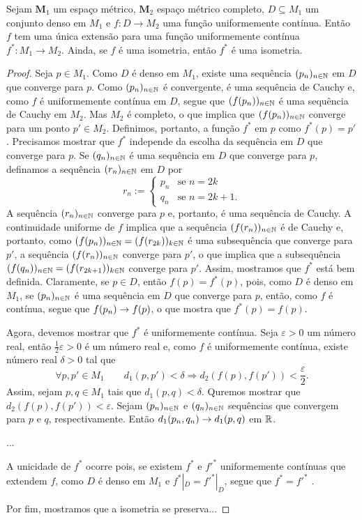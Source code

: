 \begin{teo}
Sejam $\bm M_1$  um espaço métrico, $\bm M_2$ espaço métrico completo, $D \subseteq M_1$ um conjunto denso em $M_1$ e $f: D \to M_2$ uma função uniformemente contínua. Então $f$ tem uma única extensão para uma função uniformemente contínua $f^*: M_1 \to M_2$. Ainda, se $f$ é uma isometria, então $f^*$ é uma isometria.
\end{teo}
\begin{proof}
	Seja $p \in M_1$. Como $D$ é denso em $M_1$, existe uma sequência $(p_n)_{n \in \mathbb{N}}$ em $D$ que converge para $p$. Como $(p_n)_{n \in \mathbb{N}}$ é convergente, é uma sequência de Cauchy e, como $f$ é uniformemente contínua em $D$, segue que $(f(p_n))_{n \in \mathbb{N}}$ é uma sequência de Cauchy em $M_2$. Mas $M_2$ é completo, o que implica que $(f(p_n))_{n \in \mathbb{N}}$ converge para um ponto $p' \in M_2$. Definimos, portanto, a função $f^*$ em $p$ como $f^*(p)=p'$. Precisamos mostrar que $f^*$ independe da escolha da sequência em $D$ que converge para $p$. Se $(q_n)_{n \in \mathbb{N}}$ é uma sequência em $D$ que converge para $p$, definamos a sequência $(r_n)_{n \in \mathbb{N}}$ em $D$ por
	\begin{equation*}
	r_n :=
			\begin{cases}
			p_n &\text{se $n=2k$}\\
			q_n &\text{se $n=2k+1$}.
			\end{cases}
	\end{equation*}
A sequência $(r_n)_{n \in \mathbb{N}}$ converge para $p$ e, portanto, é uma sequência de Cauchy. A continuidade uniforme de $f$ implica que a sequência $(f(r_n))_{n \in \mathbb{N}}$ é de Cauchy e, portanto, como $(f(p_n))_{n \in \mathbb{N}}=(f(r_{2k}))_{k \in \mathbb{N}}$ é uma subsequência que converge para $p'$, a sequência $(f(r_n))_{n \in \mathbb{N}}$ converge para $p'$, o que implica que a subsequência $(f(q_n))_{n \in \mathbb{N}}=(f(r_{2k+1}))_{k \in \mathbb{N}}$ converge para $p'$. Assim, mostramos que $f^*$ está bem definida. Claramente, se $p \in D$, então $f(p)=f^*(p)$, pois, como $D$ é denso em $M_1$, se $(p_n)_{n \in \mathbb{N}}$ é uma sequência em $D$ que converge para $p$, então, como $f$ é contínua, segue que $f(p_n) \rightarrow f(p)$, o que mostra que $f^*(p)=f(p)$.

	Agora, devemos mostrar que $f^*$ é uniformemente contínua. Seja $\varepsilon > 0$ um número real, então $\frac{1}{2}\varepsilon > 0$ é um número real e, como $f$ é uniformemente contínua, existe número real $\delta > 0$ tal que
	\begin{equation*}
	\forall p,p' \in M_1 \qquad d_1(p,p') < \delta \Rightarrow d_2(f(p),f(p')) < \frac{\varepsilon}{2}.
	\end{equation*}
Assim, sejam $p,q \in M_1$ tais que $d_1(p,q) < \delta$. Quremos mostrar que $d_2(f(p),f(p')) < \varepsilon$. Sejam $(p_n)_{n \in \mathbb{N}}$ e $(q_n)_{n \in \mathbb{N}}$ sequências que convergem para $p$ e $q$, respectivamente. Então $d_1(p_n,q_n) \rightarrow d_1(p,q)$ em $\mathbb{R}$.

...

	A unicidade de $f^*$ ocorre pois, se existem $f^*$ e $f'^*$ uniformemente contínuas que extendem $f$, como $D$ é denso em $M_1$ e $f^*|_D = f'^*|_D$, segue que $f^* = f'^*$ .
	
	Por fim, mostramos que a isometria se preserva...
\end{proof}

